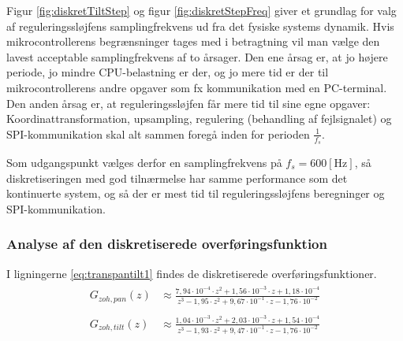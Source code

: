 Figur \ref{fig:diskretTiltStep} og figur \ref{fig:diskretStepFreq}
giver et grundlag for valg af reguleringssløjfens samplingfrekvens ud fra det fysiske systems dynamik.
Hvis mikrocontrollerens begrænsninger tages med i betragtning vil man vælge den lavest acceptable
samplingfrekvens af to årsager. Den ene årsag er, at jo højere periode, jo mindre CPU-belastning er der,
og jo mere tid er der til mikrocontrollerens andre opgaver som fx kommunikation med en PC-terminal.
Den anden årsag er, at reguleringssløjfen får mere tid til sine egne opgaver:
Koordinattransformation, upsampling, regulering (behandling af fejlsignalet) og SPI-kommunikation skal alt sammen foregå
inden for perioden \(\frac{1}{f_s}\).

Som udgangspunkt vælges derfor en samplingfrekvens på \(f_s=600 \mathrm{\left[Hz\right]}\),
så diskretiseringen med god tilnærmelse har samme performance som det kontinuerte system,
og så der er mest tid til reguleringssløjfens beregninger og SPI-kommunikation.

\subsubsection{Analyse af den diskretiserede overføringsfunktion}
I ligningerne \ref{eq:transpantilt1} findes de diskretiserede overføringsfunktioner.
\begin{align}
\label{eq:transpantilt1}
\begin{split}
	G_{zoh,pan}\left(z\right)&\approx\frac{7,94\cdot{}10^{-4}\cdot{}z^2
							+1,56\cdot{}10^{-3}\cdot{}z
							+1,18\cdot{}10^{-4}}
							{z^3 - 1,95\cdot{}z^2+9,67\cdot{}10^{-1}\cdot{z}-1,76\cdot{}10^{-2}}
	\\
	\\
	G_{zoh,tilt}\left(z\right)&\approx\frac{1,04\cdot{}10^{-3}\cdot{}z^2
							+2,03\cdot{}10^{-3}\cdot{}z
							+1,54\cdot{}10^{-4}}
							{z^3 - 1,93\cdot{}z^2+9,47\cdot{}10^{-1}\cdot{z}-1,76\cdot{}10^{-2}}
\end{split}
\end{align}
 
